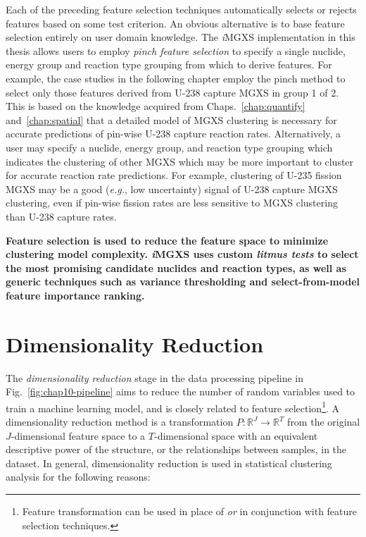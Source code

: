 Each of the preceding feature selection techniques automatically selects or rejects features based on some test criterion. An obvious alternative is to base feature selection entirely on user domain knowledge. The \textit{i}\ac{MGXS} implementation in this thesis allows users to employ \textit{pinch feature selection} to specify a single nuclide, energy group and reaction type grouping from which to derive features. For example, the case studies in the following chapter employ the pinch method to select only those features derived from U-238 capture \ac{MGXS} in group 1 of 2. This is based on the knowledge acquired from Chaps.~\ref{chap:quantify} and~\ref{chap:spatial} that a detailed model of \ac{MGXS} clustering is necessary for accurate predictions of pin-wise U-238 capture reaction rates. Alternatively, a user may specify a nuclide, energy group, and reaction type grouping which indicates the clustering of other \ac{MGXS} which may be more important to cluster for accurate reaction rate predictions. For example, clustering of U-235 fission \ac{MGXS} may be a good (\textit{e.g.}, low uncertainty) signal of U-238 capture \ac{MGXS} clustering, even if pin-wise fission rates are less sensitive to \ac{MGXS} clustering than U-238 capture rates.


\begin{emphbox}
\textbf{Feature selection is used to reduce the feature space to minimize clustering model complexity. \textit{i}\ac{MGXS} uses custom \textit{litmus tests} to select the most promising candidate nuclides and reaction types, as well as generic techniques such as variance thresholding and select-from-model feature importance ranking.}
\end{emphbox}


\section{Dimensionality Reduction}
\label{sec:chap10-dimension-reduce}

The \textit{dimensionality reduction} stage in the data processing pipeline in Fig.~\ref{fig:chap10-pipeline} aims to reduce the number of random variables used to train a machine learning model, and is closely related to feature selection\footnote{Feature transformation can be used in place of \textit{or} in conjunction with feature selection techniques.}. A dimensionality reduction method is a transformation $P: \mathbb{R}^{J} \rightarrow \mathbb{R}^{T}$ from the original $J$-dimensional feature space to a $T$-dimensional space with an equivalent descriptive power of the structure, or the relationships between samples, in the dataset. In general, dimensionality reduction is used in statistical clustering analysis for the following reasons:

